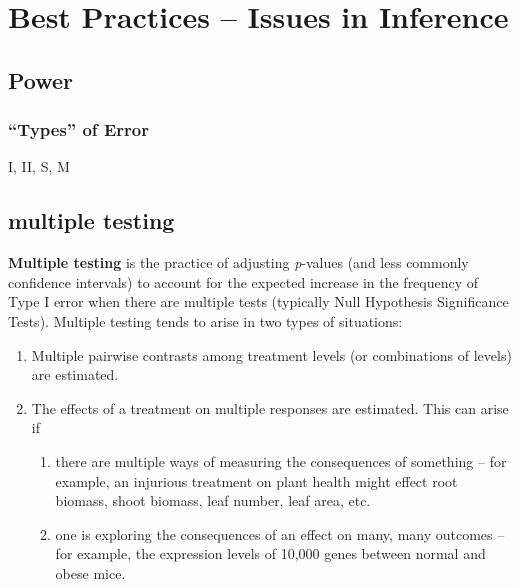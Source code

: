 \documentclass[]{book}
\providecommand{\tightlist}{%
  \setlength{\itemsep}{0pt}\setlength{\parskip}{0pt}}
\begin{document}
\chapter{Best Practices -- Issues in
Inference}\label{best-practices-issues-in-inference}

\section{Power}\label{power}

\subsection{\texorpdfstring{``Types'' of
Error}{Types of Error}}\label{types-of-error}

I, II, S, M

\section{multiple testing}\label{multiple-testing}

\textbf{Multiple testing} is the practice of adjusting \emph{p}-values
(and less commonly confidence intervals) to account for the expected
increase in the frequency of Type I error when there are multiple tests
(typically Null Hypothesis Significance Tests). Multiple testing tends
to arise in two types of situations:

\begin{enumerate}
\def\labelenumi{\arabic{enumi}.}
\tightlist
\item
  Multiple pairwise contrasts among treatment levels (or combinations of
  levels) are estimated.
\item
  The effects of a treatment on multiple responses are estimated. This
  can arise if

  \begin{enumerate}
  \def\labelenumii{\alph{enumii}.}
  \tightlist
  \item
    there are multiple ways of measuring the consequences of something
    -- for example, an injurious treatment on plant health might effect
    root biomass, shoot biomass, leaf number, leaf area, etc.
  \item
    one is exploring the consequences of an effect on many, many
    outcomes -- for example, the expression levels of 10,000 genes
    between normal and obese mice.
  \end{enumerate}
\end{enumerate}
\end{document}
